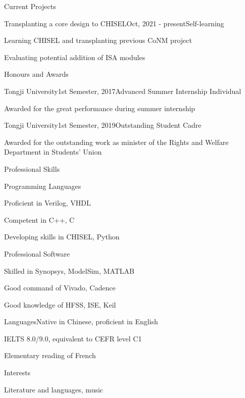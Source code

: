 \documentclass{resume} %
\begin{document}
\newpage

\begin{rSection}{Current Projects}
	
	\begin{rSubsection}{Transplanting a core design to CHISEL}{Oct, 2021 - present}{Self-learning}{}
		\item Learning CHISEL and transplanting previous CoNM project
		\item Evaluating potential addition of ISA modules
	\end{rSubsection}

\end{rSection}

\begin{rSection}{Honours and Awards}
	
	\begin{rSubsection}{Tongji University}{1st Semester, 2017}{Advanced Summer Internship Individual}{}
		\item Awarded for the great performance during summer internship
	\end{rSubsection}
		
	\begin{rSubsection}{Tongji University}{1st Semester, 2019}{Outstanding Student Cadre}{}
		\item Awarded for the outstanding work as minister of the Rights and Welfare Department in Students' Union
	\end{rSubsection}

\end{rSection}

\begin{rSection}{Professional Skills}
	
	\begin{rSubsection}{Programming Languages}{}{}{}
		\item Proficient in Verilog, VHDL
		\item Competent in C++, C
		\item Developing skills in CHISEL, Python
	\end{rSubsection}

	\begin{rSubsection}{Professional Software}{}{}{}
		\item Skilled in Synopsys, ModelSim, MATLAB 
		\item Good command of Vivado, Cadence
		\item Good knowledge of HFSS, ISE, Keil
	\end{rSubsection}

	\begin{rSubsection}{Languages}{}{Native in Chinese, proficient in English}{}
		\item IELTS 8.0/9.0, equivalent to CEFR level C1
		\item Elementary reading of French
	\end{rSubsection}

\end{rSection}

\begin{rSection}{Interests}
	\item Literature and languages, music
\end{rSection}
\end{document}
